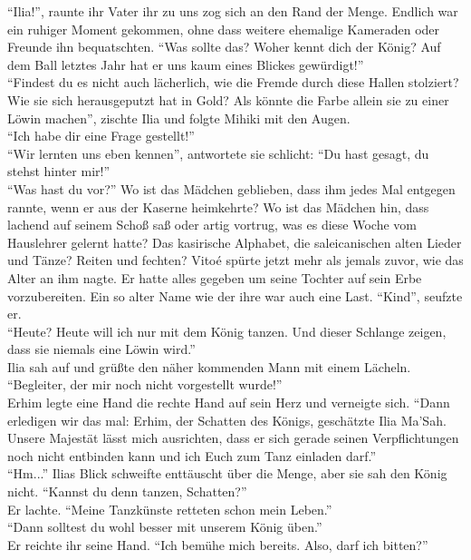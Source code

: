 ``Ilia!'', raunte ihr Vater ihr zu uns zog sich an den Rand der Menge. Endlich war ein ruhiger 
Moment gekommen, ohne dass weitere ehemalige Kameraden oder Freunde ihn bequatschten. ``Was sollte 
das? Woher kennt dich der König? Auf dem Ball letztes Jahr hat er uns kaum eines Blickes 
gewürdigt!''\\
``Findest du es nicht auch lächerlich, wie die Fremde durch diese Hallen stolziert? Wie sie sich 
herausgeputzt hat in Gold? Als könnte die Farbe allein sie zu einer Löwin machen'', zischte Ilia 
und folgte Mihiki mit den Augen.\\
``Ich habe dir eine Frage gestellt!''\\
``Wir lernten uns eben kennen'', antwortete sie schlicht: ``Du hast gesagt, du stehst hinter 
mir!''\\
``Was hast du vor?'' Wo ist das Mädchen geblieben, dass ihm jedes Mal entgegen rannte, wenn er aus 
der Kaserne heimkehrte? Wo ist das Mädchen hin, dass lachend auf seinem Schoß saß oder artig 
vortrug, was es diese Woche vom Hauslehrer gelernt hatte? Das kasirische Alphabet, die 
saleicanischen alten Lieder und Tänze? Reiten und fechten? Vitoé spürte jetzt mehr als jemals 
zuvor, wie das Alter an ihm nagte. Er hatte alles gegeben um seine Tochter auf sein Erbe 
vorzubereiten. Ein so alter Name wie der ihre war auch eine Last. ``Kind'', seufzte er.\\
``Heute? Heute will ich nur mit dem König tanzen. Und dieser Schlange zeigen, dass sie niemals eine 
Löwin wird.''\\
Ilia sah auf und grüßte den näher kommenden Mann mit einem Lächeln. ``Begleiter, der mir noch nicht 
vorgestellt wurde!''\\
Erhim legte eine Hand die rechte Hand auf sein Herz und verneigte sich. ``Dann erledigen wir das 
mal: Erhim, der Schatten des Königs, geschätzte Ilia Ma'Sah. Unsere Majestät lässt mich ausrichten, 
dass er sich gerade seinen Verpflichtungen noch nicht entbinden kann und ich Euch zum Tanz einladen 
darf.''\\
``Hm...'' Ilias Blick schweifte enttäuscht über die Menge, aber sie sah den König nicht. ``Kannst 
du denn tanzen, Schatten?''\\
Er lachte. ``Meine Tanzkünste retteten schon mein Leben.''\\
``Dann solltest du wohl besser mit unserem König üben.''\\
Er reichte ihr seine Hand. ``Ich bemühe mich bereits. Also, darf ich bitten?''\\


